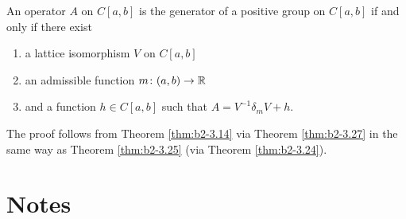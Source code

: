 \begin{theorem}\label{thm:b2-3.28}
An operator $A$ on $C[a,b]$ is the generator of a positive group on $C[a,b]$ if and only if there exist
\begin{enumerate}[--]
\item 
a lattice isomorphism $V$ on $C[a,b]$
\item 
an admissible function $m \colon (a,b) \to \mathbb{R}$
\item 
and a function $h \in C[a,b]$ such that $A = V^{-1}\delta_{m}V + h$.
\end{enumerate}
\end{theorem}

The proof follows from Theorem \ref{thm:b2-3.14} via Theorem \ref{thm:b2-3.27} in the same way as Theorem \ref{thm:b2-3.25} (via Theorem \ref{thm:b2-3.24}).
\section*{Notes}

